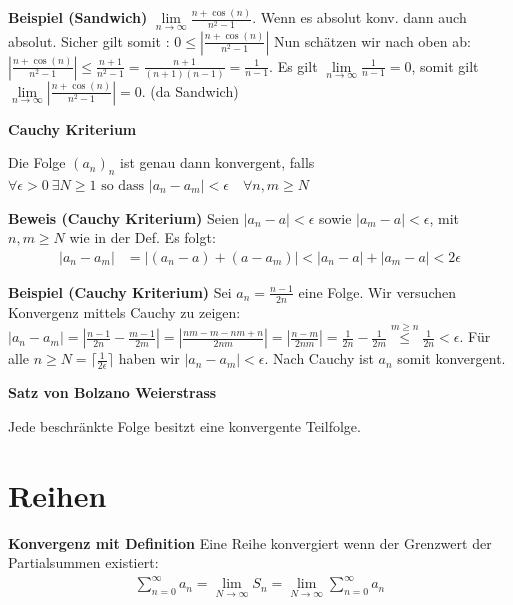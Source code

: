 \documentclass[25pt]{sciposter}
\newcommand{\limm}{\lim\limits_{n \to \infty}}
\newenvironment{method}[1]{\begin{mdframed}[backgroundcolor=blue!10,innertopmargin=15pt, innerbottommargin=15pt, nobreak=true]
		\textbf{#1 }
	}
	{ 
	\end{mdframed}
}
\begin{document}
\begin{multicols}{3}
\textbf{Beispiel (Sandwich)}
$\limm \frac{n + \cos(n)}{n^2 -1}$. Wenn es absolut konv. dann auch absolut. Sicher gilt somit : $0 \leq \left|\frac{n + \cos(n)}{n^2 -1}\right|$ Nun schätzen wir nach oben ab: $\left|\frac{n + \cos(n)}{n^2 -1}\right| \leq \frac{n+1}{n^2 - 1} = \frac{n+1}{(n+1)(n-1)} = \frac{1}{n-1}$. Es gilt $\limm \frac{1}{n-1} = 0$, somit gilt $\limm \left|\frac{n + \cos(n)}{n^2 -1}\right| = 0$. (da Sandwich)



\begin{method}{Cauchy Kriterium}
	Die Folge $(a_n)_n$ ist genau dann konvergent, falls $\forall  \epsilon > 0 \ \exists N \geq 1 \text{ so dass } |a_n - a_m| < \epsilon \quad \forall n,m \geq N$
\end{method}

\textbf{Beweis (Cauchy Kriterium)} Seien $|a_n - a |< \epsilon$ sowie $|a_m - a| < \epsilon$, mit $n,m \geq N$ wie in der Def. Es folgt: 
\begin{align*}
	|a_n - a_m| &= |(a_n-a) + (a - a_m)| < |a_n - a| + |a_m - a| < 2\epsilon
\end{align*}

\textbf{Beispiel (Cauchy Kriterium)}
Sei $a_n = \frac{n-1}{2n}$ eine Folge. Wir versuchen Konvergenz mittels Cauchy zu zeigen:\\
$|a_n - a_m| = |\frac{n-1}{2n} - \frac{m-1}{2m}| = |\frac{nm-m-nm+n}{2nm}| = |\frac{n-m}{2nm}| = \frac{1}{2n} - \frac{1}{2m} \stackrel{m\geq n}{\leq} \frac{1}{2n} < \epsilon$. Für alle $n \geq N = \lceil \frac{1}{2\epsilon} \rceil$ haben wir $|a_n - a_m| < \epsilon$. Nach Cauchy ist $a_n$ somit konvergent.

\begin{method}{Satz von Bolzano Weierstrass}
	Jede beschränkte Folge besitzt eine konvergente Teilfolge.
\end{method}



\section{Reihen}

\begin{method}{Konvergenz mit Definition} Eine Reihe konvergiert wenn der Grenzwert der Partialsummen existiert:
	\begin{align*}
			\sum_{n=0}^{\infty} a_n  = \lim\limits_{N\to\infty} S_n = \lim\limits_{N\to\infty} \sum_{n=0}^{\infty} a_n
	\end{align*}
\end{method}


\end{multicols}
\end{document}
